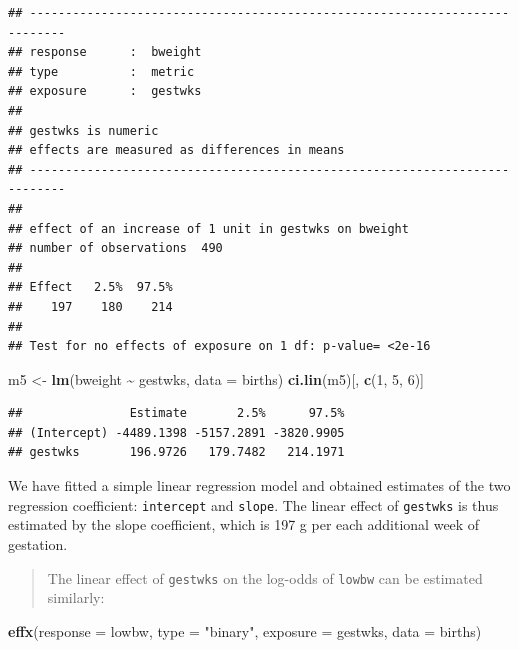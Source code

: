 \documentclass[
]{book}
\newenvironment{Shaded}{\begin{snugshade}}{\end{snugshade}}
\newcommand{\AttributeTok}[1]{\textcolor[rgb]{0.13,0.29,0.53}{#1}}
\newcommand{\DecValTok}[1]{\textcolor[rgb]{0.00,0.00,0.81}{#1}}
\newcommand{\FunctionTok}[1]{\textcolor[rgb]{0.13,0.29,0.53}{\textbf{#1}}}
\newcommand{\NormalTok}[1]{#1}
\newcommand{\OtherTok}[1]{\textcolor[rgb]{0.56,0.35,0.01}{#1}}
\newcommand{\SpecialCharTok}[1]{\textcolor[rgb]{0.81,0.36,0.00}{\textbf{#1}}}
\newcommand{\StringTok}[1]{\textcolor[rgb]{0.31,0.60,0.02}{#1}}
\begin{document}
\begin{verbatim}
## --------------------------------------------------------------------------- 
## response      :  bweight 
## type          :  metric 
## exposure      :  gestwks 
## 
## gestwks is numeric 
## effects are measured as differences in means 
## --------------------------------------------------------------------------- 
## 
## effect of an increase of 1 unit in gestwks on bweight 
## number of observations  490 
## 
## Effect   2.5%  97.5% 
##    197    180    214 
## 
## Test for no effects of exposure on 1 df: p-value= <2e-16
\end{verbatim}

\begin{Shaded}
\begin{Highlighting}[]
\NormalTok{m5 }\OtherTok{\textless{}{-}} \FunctionTok{lm}\NormalTok{(bweight }\SpecialCharTok{\textasciitilde{}}\NormalTok{ gestwks, }\AttributeTok{data =}\NormalTok{ births)}
\FunctionTok{ci.lin}\NormalTok{(m5)[, }\FunctionTok{c}\NormalTok{(}\DecValTok{1}\NormalTok{, }\DecValTok{5}\NormalTok{, }\DecValTok{6}\NormalTok{)]}
\end{Highlighting}
\end{Shaded}

\begin{verbatim}
##               Estimate       2.5%      97.5%
## (Intercept) -4489.1398 -5157.2891 -3820.9905
## gestwks       196.9726   179.7482   214.1971
\end{verbatim}

We have fitted a simple linear regression model and
obtained estimates of the
two regression coefficient: \texttt{intercept} and \texttt{slope}.
The linear effect of \texttt{gestwks} is thus estimated by the
slope coefficient, which is 197 g per each additional week of gestation.

\begin{quote}
The linear effect of \texttt{gestwks} on the log-odds of \texttt{lowbw} can be estimated similarly:
\end{quote}

\begin{Shaded}
\begin{Highlighting}[]
\FunctionTok{effx}\NormalTok{(}\AttributeTok{response =}\NormalTok{ lowbw, }\AttributeTok{type =} \StringTok{"binary"}\NormalTok{, }\AttributeTok{exposure =}\NormalTok{ gestwks, }\AttributeTok{data =}\NormalTok{ births)}
\end{Highlighting}
\end{Shaded}
\end{document}
